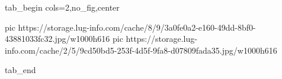  
 
 
 
 

\ifcmt
  tab_begin cols=2,no_fig,center

     pic https://storage.lug-info.com/cache/8/9/3a0fe0a2-e160-49dd-8bf0-43881033fc32.jpg/w1000h616
		 pic https://storage.lug-info.com/cache/2/5/9cd50bd5-253f-4d5f-9fa8-d07809fada35.jpg/w1000h616

  tab_end
\fi

